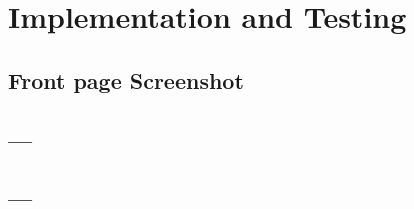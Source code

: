 \documentclass[../Report.tex]{subfiles}
\begin{document}
\chapter{Implementation and Testing}

\section{Front page Screenshot}

\section{---}

\section{---}
\end{document}

